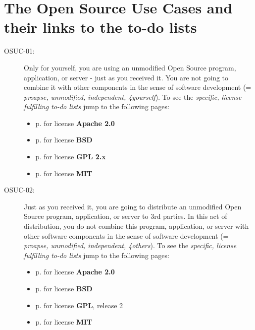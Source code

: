 \section{The Open Source Use Cases and their links to the to-do lists}

\begin{description}

\item[OSUC-01:]\label{OSUC-01-DEF}
Only for yourself, you are using an unmodified Open Source program, application,
or server - just as you received it. You are not going to combine it with other
components in the sense of software development (= \textit{proapse, unmodified,
independent, 4yourself}). 
To see the \textit{specific, license fulfilling to-do lists} jump to the
following pages:
  \begin{itemize}
    \item p. \pageref{OSUC-01-Apache20} for license \textbf{Apache 2.0}
    \item p. \pageref{OSUC-01-BSD} for license \textbf{BSD}
    \item p. \pageref{OSUC-01-GPL2X} for license \textbf{GPL 2.x}
    \item p. \pageref{OSUC-01-MIT} for license \textbf{MIT}
  \end{itemize}

\item[OSUC-02:]\label{OSUC-02-DEF} Just as you received it, you are going to
distribute an unmodified Open Source program, application, or server to 3rd
parties. In this act of distribution, you do not combine this program,
application, or server with other software components in the sense of software
development (= \textit{proapse, unmodified, independent, 4others}). 
To see the \textit{specific, license fulfilling to-do lists} jump to the
following pages:
  \begin{itemize}
    \item p. \pageref{OSUC-02-Apache20} for license \textbf{Apache 2.0}
    \item p. \pageref{OSUC-02-BSD} for license \textbf{BSD}
    \item p. \pageref{OSUC-02-GPL2X} for license \textbf{GPL}, release 2
    \item p. \pageref{OSUC-02-MIT} for license \textbf{MIT}
  \end{itemize}


\end{description}
